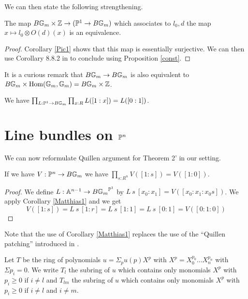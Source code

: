 We can then state the following strengthening.

\begin{proposition}\label{Matthias}
  The map $B\mathbb{G}_m\times\mathbb{Z}\rightarrow (\mathbb{P}^1\rightarrow B\mathbb{G}_m)$
  which associates to $l_0,d$ the map $x\mapsto l_0\otimes O(d)(x)$ is an equivalence.
\end{proposition}

\begin{proof}
  Corollary \ref{Pic1} shows that this map is essentially surjective.
  We can then use  Corollary 8.8.2 in \cite{HoTT} to conclude using Proposition \ref{const}.
\end{proof}

 It is a curious remark that $B\mathbb{G}_m\rightarrow B\mathbb{G}_m$ is also equivalent
 to $B\mathbb{G}_m\times \mathrm{Hom}(\mathbb{G}_m,\mathbb{G}_m) = B\mathbb{G}_m\times\mathbb{Z}$.

\begin{corollary}\label{Matthias1}
  We have $\prod_{L:\mathbb{P}^1\rightarrow B\mathbb{G}_m}\prod_{x:R}L([1:x]) = L([0:1])$.
\end{corollary}

\section{Line bundles on $\mathbb{P}^n$}

We can now reformulate Quillen argument for Theorem 2' \cite{Quillen} in our setting.

\begin{proposition}\label{trivial}
  If we have $V:\mathbb{P}^n\rightarrow B\mathbb{G}_m$ we have ${\prod_{s:R^n}V([1:s]) = V([1:0])}$.
\end{proposition}

\begin{proof}
  We define $L:\mathbb{A}^{n-1}\rightarrow {B\mathbb{G}_m}^{\mathbb{P}^1}$ by $L~s~[x_0:x_1] = V([x_0:x_1:x_0s])$.
  We apply Corollary \ref{Matthias1} and we get
  $$V([1:s]) = L~s~[1:r] = L~s~[1:1] = L~s~[0:1] = V([0:1:0])$$
\end{proof}

 Note that the use of Corollary \ref{Matthias1} replaces the use of the ``Quillen patching''
 \cite{LQ} introduced in \cite{Quillen}.

\medskip

Let $T$ be the ring of polynomials $u = \Sigma_p u(p)X^p$ with
$X^p = X_0^{p_0}\dots X_n^{p_n}$ with $\Sigma p_i = 0$. We write $T_l$ the subring
of $u$ which contains only monomials $X^p$ with $p_i\geqslant 0$ if $i\neq l$
and $T_{lm}$ the subring of $u$ 
which contains only monomials $X^p$ with $p_i\geqslant 0$ if $i\neq l$ and $i\neq m$.

